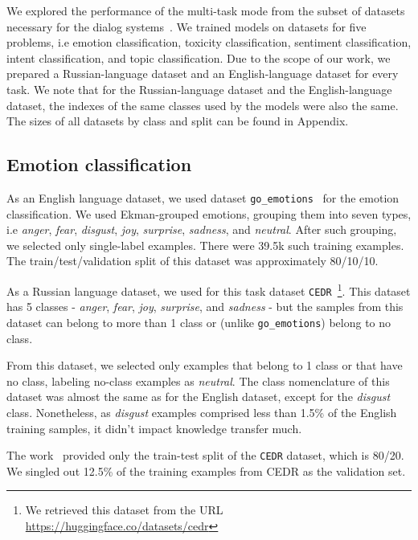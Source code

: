 We explored the performance of the multi-task mode from the subset of datasets necessary for the dialog systems~\cite{wochat,lrec}. We trained models on datasets for five problems, i.e emotion classification, toxicity classification, sentiment classification, intent classification, and topic classification. Due to the scope of our work, we prepared a Russian-language dataset and an English-language dataset for every task. We note that for the Russian-language dataset and the English-language dataset, the indexes of the same classes used by the models were also the same. The sizes of all datasets by class and split can be found in Appendix. 

\subsection{Emotion classification }

As an English language dataset, we used dataset \texttt{go\_emotions}~\cite{emotions} for the emotion classification. We used Ekman-grouped emotions, grouping them into seven types, i.e \textit{anger}, \textit{fear}, \textit{disgust}, \textit{joy}, \textit{surprise}, \textit{sadness}, and \textit{neutral}. After such grouping, we selected only single-label examples. There were 39.5k such training examples. The train/test/validation split of this dataset was approximately 80/10/10.

As a Russian language dataset, we used for this task dataset \texttt{CEDR}~\cite{ru_emotions}\footnote{We retrieved this dataset from the URL \url{https://huggingface.co/datasets/cedr}}. This dataset has 5 classes - \textit{anger}, \textit{fear}, \textit{joy}, \textit{surprise}, and \textit{sadness} - but the samples from this dataset can belong to more than 1 class or (unlike \texttt{go\_emotions}) belong to no class. 

From this dataset, we selected only examples that belong to 1 class or that have no class, labeling no-class examples as \textit{neutral}. The class nomenclature of this dataset was almost the same as for the English dataset, except for the \textit{disgust} class. Nonetheless, as \textit{disgust} examples comprised less than 1.5\% of the English training samples, it didn't impact knowledge transfer much.

The work~\cite{ru_emotions} provided only the train-test split of the \texttt{CEDR} dataset, which is 80/20. We singled out 12.5\% of the training examples from CEDR as the validation set. 

